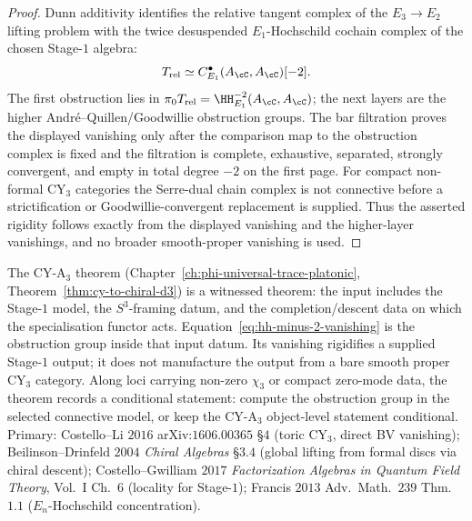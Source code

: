 \begin{proof}
Dunn additivity identifies the relative tangent complex of the
$E_3\to E_2$ lifting problem with the twice desuspended
$E_1$-Hochschild cochain complex of the chosen Stage-$1$ algebra:
\[
 T_{\mathrm{rel}}\simeq C^\bullet_{E_1}(A_\cC,A_\cC)[-2].
\]
The first obstruction lies in
$\pi_0T_{\mathrm{rel}}=\HH^{-2}_{E_1}(A_\cC,A_\cC)$; the next layers are
the higher Andr\'e--Quillen/Goodwillie obstruction groups. The bar
filtration proves the displayed vanishing only after the comparison map
to the obstruction complex is fixed and the filtration is complete,
exhaustive, separated, strongly convergent, and empty in total degree
$-2$ on the first page. For compact non-formal CY$_3$ categories the
Serre-dual chain complex is not connective before a strictification or
Goodwillie-convergent replacement is supplied.
Thus the asserted rigidity follows exactly from the displayed vanishing
and the higher-layer vanishings, and no broader smooth-proper
vanishing is used.
\end{proof}

\begin{remark}
\label{rem:hh-minus-2-cy-a3-algebraic-heart}
The CY-A$_3$ theorem
(Chapter~\ref{ch:phi-universal-trace-platonic}, Theorem~\ref{thm:cy-to-chiral-d3})
is a witnessed theorem: the input includes the Stage-$1$ model, the
$S^3$-framing datum, and the completion/descent data on which the
specialisation functor acts.  Equation~\eqref{eq:hh-minus-2-vanishing}
is the obstruction group inside that input datum.  Its vanishing
rigidifies a supplied Stage-$1$ output; it does not manufacture the
output from a bare smooth proper CY$_3$ category.  Along loci carrying
non-zero $\chi_3$ or compact zero-mode data, the theorem records a
conditional statement: compute the obstruction group in the selected
connective model, or keep the CY-A$_3$ object-level statement
conditional.
Primary:
Costello--Li $2016$ arXiv:$1606.00365$ \S$4$ (toric CY$_3$, direct BV
vanishing);
Beilinson--Drinfeld $2004$ \emph{Chiral Algebras} \S$3.4$ (global
lifting from formal discs via chiral descent);
Costello--Gwilliam $2017$ \emph{Factorization Algebras in Quantum
Field Theory}, Vol.~I Ch.~$6$ (locality for Stage-$1$);
Francis $2013$ Adv.\ Math.\ $239$ Thm.~$1.1$ ($E_n$-Hochschild
concentration).
\end{remark}

